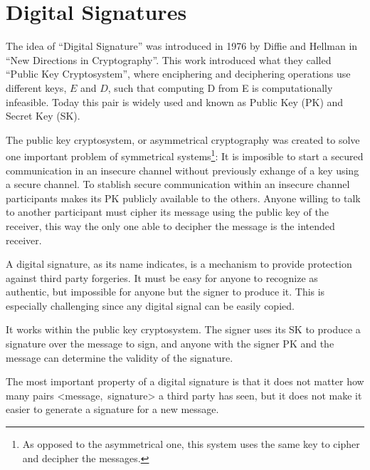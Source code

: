 \section{Digital Signatures}
The idea of ``Digital Signature'' was introduced in 1976 by Diffie and
  Hellman in ``New Directions in Cryptography''\cite{diffie1976new}. This work
  introduced what they called ``Public Key Cryptosystem'', where enciphering and
  deciphering operations use different keys, $E$ and $D$, such that computing D
  from E is computationally infeasible.
Today this pair is widely used and known as Public Key (PK) and Secret Key (SK).

The public key cryptosystem, or asymmetrical cryptography was created to solve
  one important problem of symmetrical systems\footnote{As opposed to the
  asymmetrical one, this system uses the same key to cipher and decipher
  the messages.}: It is imposible to start a secured communication in an
  insecure channel without previously exhange of a key using a secure channel.
To stablish secure communication within an insecure channel participants makes
  its PK publicly available to the others.
Anyone willing to talk to another participant must cipher its message using the
  public key of the receiver, this way the only one able to decipher the message
  is the intended receiver.

A digital signature, as its name indicates, is a mechanism to provide protection
  against third party forgeries. It must be easy for anyone to recognize as
  authentic, but impossible for anyone but the signer to produce it. This is
  especially challenging since any digital signal can be easily copied.

It works within the public key cryptosystem.
The signer uses its SK to produce a signature over the message to sign, and
  anyone with the signer PK and the message can determine the validity of the
  signature.

The most important property of a digital signature is that it does not matter how
  many pairs \mbox{\textless message, signature\textgreater} a third party has
  seen, but it does not make it easier to generate a signature for a new
  message.
